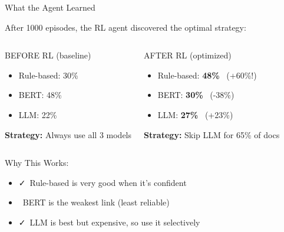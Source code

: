 \documentclass[aspectratio=169]{beamer}
\begin{document}
\begin{frame}{What the Agent Learned \faGraduationCap}
\begin{block}{After 1000 episodes, the RL agent discovered the optimal strategy:}
\end{block}

\vspace{0.3cm}

\begin{columns}[T]
\begin{alertblock}{BEFORE RL (baseline)}
\begin{itemize}
    \item Rule-based: 30\%
    \item BERT: 48\%
    \item LLM: 22\%
\end{itemize}

\vspace{0.2cm}
\textbf{Strategy:} Always use all 3 models
\end{alertblock}

\begin{exampleblock}{AFTER RL (optimized)}
\begin{itemize}
    \item Rule-based: \textbf{48\%} \faArrowUp\ (+60\%!)
    \item BERT: \textbf{30\%} \faArrowDown\ (-38\%)
    \item LLM: \textbf{27\%} \faArrowUp\ (+23\%)
\end{itemize}

\vspace{0.2cm}
\textbf{Strategy:} Skip LLM for 65\% of docs
\end{exampleblock}
\end{columns}

\vspace{0.5cm}

\begin{block}{Why This Works:}
\begin{itemize}
    \item \faCheck\ Rule-based is very good when it's confident
    \item \faTimes\ BERT is the weakest link (least reliable)
    \item \faCheck\ LLM is best but expensive, so use it selectively
\end{itemize}
\end{block}
\end{frame}
\end{document}
